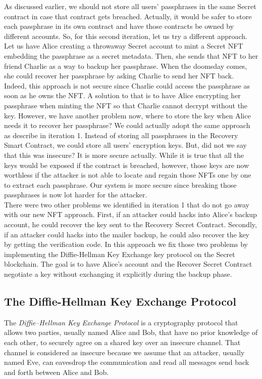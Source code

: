 \documentclass[12pt]{article}
\begin{document}
As discussed earlier, we should not store all users' passphrases in the same Secret contract in case that contract gets breached. Actually, it would be safer to store each passphrase in its own contract and have those contracts be owned by different accounts. So, for this second iteration, let us try a different approach. Let us have Alice creating a throwaway Secret account to mint a Secret NFT embedding the passphrase as a secret metadata. Then, she sends that NFT to her friend Charlie as a way to backup her passphrase. When the doomsday comes, she could recover her passphrase by asking Charlie to send her NFT back. Indeed, this approach is not secure since Charlie could access the passphrase as soon as he owns the NFT. A solution to that is to have Alice encrypting her passphrase when minting the NFT so that Charlie cannot decrypt without the key. However, we have another problem now, where to store the key when Alice needs it to recover her passphrase? We could actually adopt the same approach as describe in iteration 1. Instead of storing all passphrases in the Recovery Smart Contract, we could store all users' encryption keys. But, did not we say that this was insecure? It is more secure actually. While it is true that all the keys would be exposed if the contract is breached, however, those keys are now worthless if the attacker is not able to locate and regain those NFTs one by one to extract each passphrase. Our system is more secure since breaking those passphrases is now lot harder for the attacker. \\

There were two other problems we identified in iteration 1 that do not go away with our new NFT approach. First, if an attacker could hacks into Alice's backup account, he could recover the key sent to the Recovery Secret Contract. Secondly, if an attacker could hacks into the mailer backup, he could also recover the key by getting the verification code. In this approach we fix those two problems by implementing the Diffie-Hellman Key Exchange key protocol on the Secret blockchain. The goal is to have Alice's account and the Recover Secret Contract negotiate a key without exchanging it explicitly during the backup phase.

\subsection{The Diffie-Hellman Key Exchange Protocol}

The {\em Diffie–Hellman Key Exchange Protocol} is a cryptography protocol that allows two parties, usually named Alice and Bob, that have no prior knowledge of each other, to securely agree on a shared key over an insecure channel. That channel is considered as insecure because we assume that an attacker, usually named Eve, can eavesdrop the communication and read all messages send back and forth between Alice and Bob. \\
\end{document}
